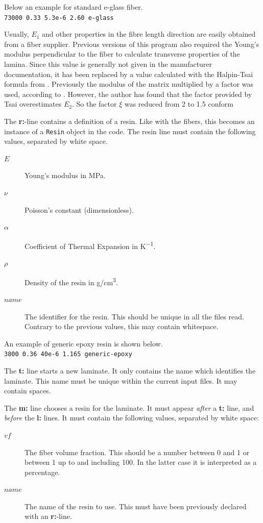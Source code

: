 \documentclass[a4paper,landscape,oneside,11pt,twocolumn]{memoir}
\begin{document}
Below an example for standard e-glass fiber.\\
\texttt{73000 0.33 5.3e-6 2.60 e-glass}

Usually, $E_1$ and other properties in the fibre length direction are easily
obtained from a fiber supplier. Previous versions of this program also
required the Young's modulus perpendicular to the fiber to calculate
transverse properties of the lamina. Since this value is generally not given
in the manufacturer documentation, it has been replaced by
a value calculated with the Halpin-Tsai formula from
\citet[p.  117]{Barbero:2018}.
Previously the modulus of the matrix multiplied by a factor was used,
according to \citet{Tsai:1992}. However, the author has found that the factor
provided by Tsai overestimates $E_2$.
So the factor $\xi$ was reduced from 2 to 1.5 conform
\citet{Giner:2014}

The \textbf{r:}-line contains a definition of a resin. Like with the
fibers, this becomes an instance of a \texttt{Resin} object in the code. The
resin line must contain the following values, separated by white space.
\begin{description}
    \item[$E$] Young's modulus in \si{MPa}.
    \item[$\nu$] Poisson's constant (dimensionless).
    \item[$\alpha$] Coefficient of Thermal Expansion in \si{K^{-1}}.
    \item[$\rho$] Density of the resin in \si{g/cm^3}.
    \item[$name$] The identifier for the resin. This should be unique in all
        the files read. Contrary to the previous values, this may contain
        whitespace.
\end{description}

An example of generic epoxy resin is shown below.\\
\texttt{3800 0.36 40e-6 1.165 generic-epoxy}

The \textbf{t:} line starts a new laminate. It only contains the name which
identifies the laminate. This name must be unique within the current input
files. It may contain spaces.

The \textbf{m:} line chooses a resin for the laminate. It must appear
\emph{after} a \textbf{t:} line, and \emph{before} the \textbf{l:} lines. It
must contain the following values, separated by white space:
\begin{description}
    \item[$vf$] The fiber volume fraction. This should be a number between
        0 and 1 or between 1 up to and including 100. In the latter case it
        is interpreted as a percentage.
    \item[$name$] The name of the resin to use. This must have been previously
        declared with an \textbf{r:}-line.
\end{description}
\end{document}
